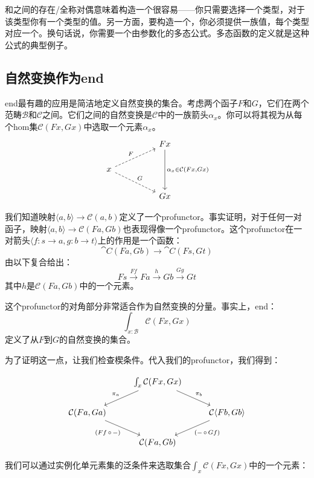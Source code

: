 \documentclass[DaoFP]{subfiles}
\begin{document}
和之间的存在/全称对偶意味着构造一个很容易——你只需要选择一个类型，对于该类型你有一个类型的值。另一方面，要构造一个，你必须提供一族值，每个类型对应一个。换句话说，你需要一个由参数化的多态公式。多态函数的定义就是这种公式的典型例子。


\subsection{自然变换作为end}

end最有趣的应用是简洁地定义自然变换的集合。考虑两个函子$F$和$G$，它们在两个范畴$\mathcal{B}$和$\mathcal{C}$之间。它们之间的自然变换是$\mathcal{C}$中的一族箭头$\alpha_x$。你可以将其视为从每个hom集$\mathcal{C} (F x, G x)$中选取一个元素$\alpha_x$。
\[
 \begin{tikzcd}
 && F x
 \arrow[dd, "{\alpha_x \in \cat C (F x, G x)}"]
 \\
 x
 \arrow[urr, dashed, "F"]
 \arrow[drr, dashed, "G"]
 \\
 && G x
 \end{tikzcd}
\]

我们知道映射$\langle a, b \rangle \to \mathcal{C} (a, b)$定义了一个profunctor。事实证明，对于任何一对函子，映射$\langle a, b \rangle \to \mathcal{C} (F a, G b)$也表现得像一个profunctor。这个profunctor在一对箭头$\langle f \colon s \to a, g \colon b \to t \rangle$上的作用是一个函数：
\[ \cat C(F a, G b) \to \cat C (F s, G t) \]
由以下复合给出：
\[ F s \xrightarrow{F f} F a \xrightarrow{h} G b \xrightarrow{G g} G t \]
其中$h$是$\mathcal{C} (F a, G b)$中的一个元素。

这个profunctor的对角部分非常适合作为自然变换的分量。事实上，end：
\[  \int_{x \colon  \mathcal{B}} \mathcal{C}(F x, G x) \]
定义了从$F$到$G$的自然变换的集合。

为了证明这一点，让我们检查楔条件。代入我们的profunctor，我们得到：

\[
 \begin{tikzcd}
 & \int_{x} \mathcal{C}(F x, G x)
 \arrow[ld, "\pi_a"']
 \arrow[rd, "\pi_b"]
 \\
  \mathcal{C} ( F a, G a )
 \arrow[dr, "{(Ff \, \circ \, -)}"']
 && \mathcal{C} \langle F b, G b \rangle
 \arrow[dl, "{(- \, \circ\, Gf)}"]
 \\
 &  \mathcal{C} ( F a, G b )
 \end{tikzcd}
\]

我们可以通过实例化单元素集的泛条件来选取集合$\int_{x} \mathcal{C}(F x, G x)$中的一个元素：
\end{document}
